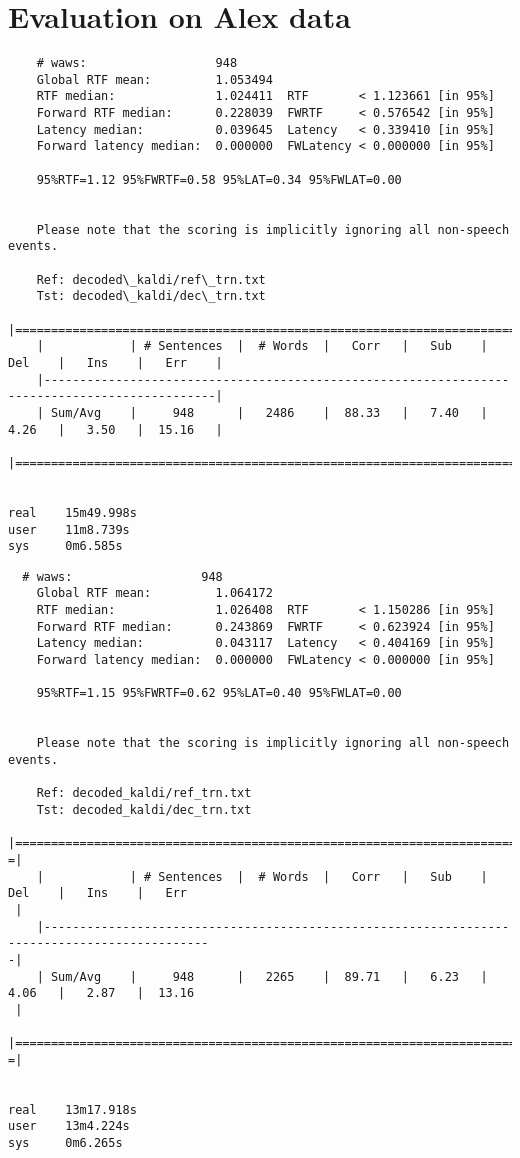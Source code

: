 \section{Evaluation on Alex data}
\label{sec:evalution}
\begin{verbatim}
    # waws:                  948
    Global RTF mean:         1.053494
    RTF median:              1.024411  RTF       < 1.123661 [in 95%]
    Forward RTF median:      0.228039  FWRTF     < 0.576542 [in 95%]
    Latency median:          0.039645  Latency   < 0.339410 [in 95%]
    Forward latency median:  0.000000  FWLatency < 0.000000 [in 95%]
    
    95%RTF=1.12 95%FWRTF=0.58 95%LAT=0.34 95%FWLAT=0.00


    Please note that the scoring is implicitly ignoring all non-speech events.
    
    Ref: decoded\_kaldi/ref\_trn.txt
    Tst: decoded\_kaldi/dec\_trn.txt
    |==============================================================================================|
    |            | # Sentences  |  # Words  |   Corr   |   Sub    |   Del    |   Ins    |   Err    |
    |----------------------------------------------------------------------------------------------|
    | Sum/Avg    |     948      |   2486    |  88.33   |   7.40   |   4.26   |   3.50   |  15.16   |
    |==============================================================================================|
    

real    15m49.998s
user    11m8.739s
sys     0m6.585s
\end{verbatim}

\begin{verbatim}
  # waws:                  948
    Global RTF mean:         1.064172
    RTF median:              1.026408  RTF       < 1.150286 [in 95%]
    Forward RTF median:      0.243869  FWRTF     < 0.623924 [in 95%]
    Latency median:          0.043117  Latency   < 0.404169 [in 95%]
    Forward latency median:  0.000000  FWLatency < 0.000000 [in 95%]
    
    95%RTF=1.15 95%FWRTF=0.62 95%LAT=0.40 95%FWLAT=0.00


    Please note that the scoring is implicitly ignoring all non-speech events.
    
    Ref: decoded_kaldi/ref_trn.txt
    Tst: decoded_kaldi/dec_trn.txt
    |=============================================================================================
=|
    |            | # Sentences  |  # Words  |   Corr   |   Sub    |   Del    |   Ins    |   Err   
 |
    |---------------------------------------------------------------------------------------------
-|
    | Sum/Avg    |     948      |   2265    |  89.71   |   6.23   |   4.06   |   2.87   |  13.16  
 |
    |=============================================================================================
=|
    

real    13m17.918s
user    13m4.224s
sys     0m6.265s
\end{verbatim}



